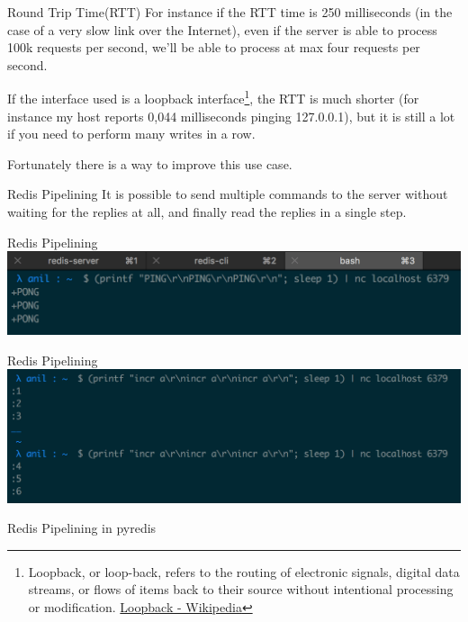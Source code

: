 \documentclass[10pt]{beamer}
\begin{document}
\begin{frame}[fragile]{Round Trip Time(RTT)}
  For instance if the RTT time is 250 milliseconds (in the case of a very slow
  link over the Internet), even if the server is able to process 100k requests
  per second, we'll be able to process at max four requests per second.

  If the interface used is a loopback interface\footnote{Loopback, or loop-back,
  refers to the routing of electronic signals, digital data streams, or flows of
  items back to their source without intentional processing or modification.
  \href{https://en.0wikipedia.org/index.php?q=aHR0cHM6Ly9lbi53aWtpcGVkaWEub3JnL3dpa2kvTG9vcGJhY2s}{Loopback - Wikipedia}},
  the RTT is much shorter (for instance my host reports 0,044 milliseconds
  pinging 127.0.0.1), but it is still a lot if you need to perform many writes
  in a row.

  Fortunately there is a way to improve this use case.
\end{frame}

\begin{frame}[fragile]{Redis Pipelining}
  It is possible to send multiple commands to the server without waiting for the
  replies at all, and finally read the replies in a single step.
\end{frame}

\begin{frame}[fragile]{Redis Pipelining}
  \includegraphics[scale=0.5]{img/pipelining}
\end{frame}

\begin{frame}[fragile]{Redis Pipelining}
  \includegraphics[scale=0.5]{img/pipelining-2}
\end{frame}

\begin{frame}[fragile]{Redis Pipelining in pyredis}
\end{frame}
\end{document}
